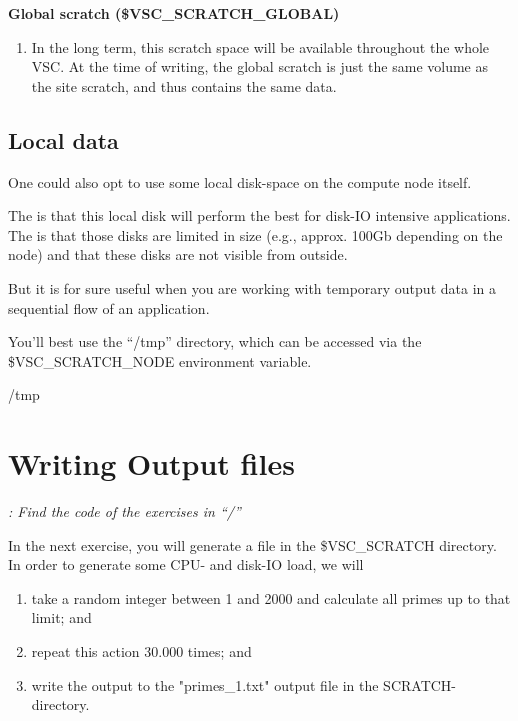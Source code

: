 \textbf{Global scratch (\$VSC\_SCRATCH\_GLOBAL)}
\begin{enumerate}
  \item In the long term, this scratch space will be available throughout the
    whole VSC. At the time of writing, the global scratch is just the same
    volume as the site scratch, and thus contains the same data.
\end{enumerate}

\subsection{Local data}

One could also opt to use some local disk-space on the compute node itself.

The  is that this local disk will perform the best for
disk-IO intensive applications.  The  is that those disks are
limited in size (e.g., approx. 100Gb depending on the node) and that these
disks are not visible from outside.

But it is for sure useful when you are working with temporary output data in a
sequential flow of an application.

You'll best use the ``/tmp'' directory, which can be accessed via the
\$VSC\_SCRATCH\_NODE environment variable.

\begin{prompt}
/tmp
\end{prompt}

\section{Writing Output files}

\textit{: Find the code of the exercises in ``\tilde/\exampledir''}

In the next exercise, you will generate a file in the \$VSC\_SCRATCH directory.
In order to generate some CPU- and disk-IO load, we will

\begin{enumerate}
\item  take a random integer between 1 and 2000 and calculate all primes up to that limit; and
\item  repeat this action 30.000 times; and
\item  write the output to the "primes\_1.txt" output file in the SCRATCH-directory.
\end{enumerate}

